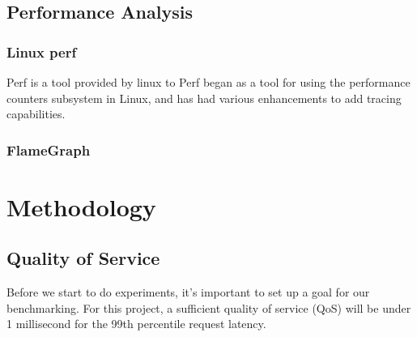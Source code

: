 \documentclass[bsc,frontabs,twoside,singlespacing,parskip,deptreport]{infthesis}     %
\begin{document}
\section{Performance Analysis}

\subsection{Linux perf}

Perf is a tool provided by linux to 
Perf began as a tool for using the performance counters subsystem in Linux, and has had various enhancements to add tracing capabilities.

\subsection{FlameGraph}






\chapter{Methodology}



\section{Quality of Service}




Before we start to do experiments, it's important to set up a goal for our benchmarking. For this project, a sufficient quality of service (QoS) will be under 1 millisecond for the 99th percentile request latency. 



\end{document}
